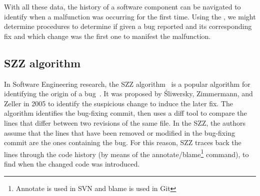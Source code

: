 \documentclass[a4paper, 12pt]{book}
\begin{document}

With all these data, the history of a software component can be navigated to identify when a malfunction was occurring for the first time. Using the \FFC, we might determine procedures to determine if given a bug reported and its corresponding fix and which change was the first one to manifest the malfunction.


\subsection{SZZ algorithm}
\label{subsec:SZZintro}

In Software Engineering research, the SZZ algorithm~\cite{sliwerski2005changes} is a popular algorithm for identifying the origin of a bug~\cite{da2016framework,rodriguez2018reproducibility}. It was proposed by \'Sliwersky, Zimmermann, and Zeller in 2005 to identify the suspicious change to induce the later fix. The algorithm identifies the bug-fixing commit, then uses a diff tool to compare the lines that differ between two revisions of the same file. In the SZZ, the authors assume that the lines that have been removed or modified in the bug-fixing commit are the ones containing the bug. For this reason, SZZ traces back the lines through the code history (by means of the annotate/blame\footnote{Annotate is used in SVN and blame is used in Git} command), to find when the changed code was introduced.
\end{document}
